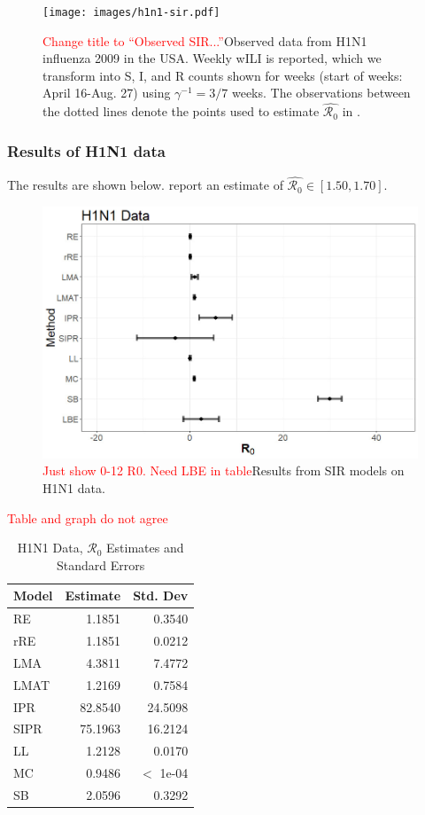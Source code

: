\documentclass[12pt]{article}
\newcommand{\com}[1]{\textcolor{red}{ #1}}
\newcommand{\rr}{\ensuremath{\mathcal{R}_0}}
\begin{document}
\begin{figure}[H]
  \centering
  \texttt{[image: images/h1n1-sir.pdf]}
  \caption{\com{Change title to ``Observed SIR...''}Observed data from H1N1 influenza 2009 in the USA.  Weekly wILI is reported, which we transform into S, I, and R counts shown for weeks (start of weeks: April 16-Aug. 27)  using $\gamma^{-1} = 3/7$ weeks.  The observations between the dotted lines denote the points used to estimate $\hat{\rr}$ in \cite{towers2009}.}
  \end{figure}
      

      \subsubsection{Results of H1N1 data}
      The results are shown below.  \cite{towers2009} report an estimate of $\hat{\rr} \in [1.50, 1.70]$.

\begin{figure}[H]
	\centering
	\includegraphics[width=\textwidth]{images/h1n1.jpg}
	\caption{\com{Just show 0-12 R0.  Need LBE in table}Results from SIR models on H1N1 data.}
\end{figure}

\com{Table and graph do not agree}
\begin{table}[H]
	
	
	\centering
	\begin{tabular}{l|r|r}
		\hline
		Model & Estimate & Std. Dev\\
		\hline
		RE & 1.1851 & 0.3540\\
		\hline
		rRE & 1.1851 & 0.0212\\
		\hline
		LMA & 4.3811 & 7.4772\\
		\hline
		LMAT & 1.2169 & 0.7584\\
		\hline
		IPR & 82.8540 & 24.5098\\
		\hline
		SIPR & 75.1963 & 16.2124\\
		\hline
		LL & 1.2128 & 0.0170\\
		\hline
		MC & 0.9486 & $<$ 1e-04 \\
		\hline
		SB & 2.0596 & 0.3292\\
		\hline
	\end{tabular}
	\caption{H1N1 Data, $\rr$ Estimates and Standard Errors}
\end{table}
\end{document}
